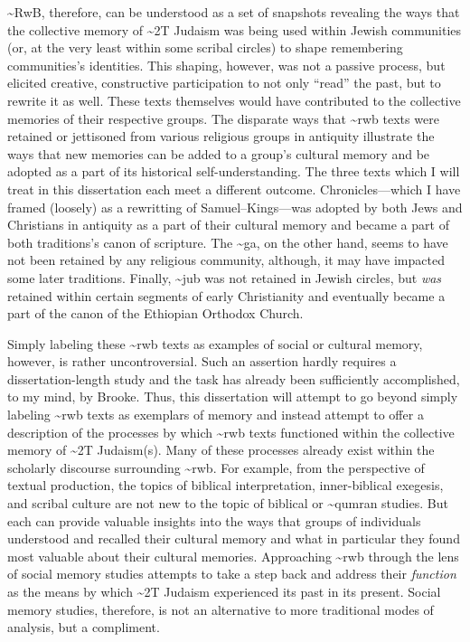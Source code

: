 \textasciitilde{}RwB, therefore, can be understood as a set of snapshots
revealing the ways that the collective memory of \textasciitilde{}2T
Judaism was being used within Jewish communities (or, at the very least
within some scribal circles) to shape remembering communities's
identities. This shaping, however, was not a passive process, but
elicited creative, constructive participation to not only ``read'' the
past, but to rewrite it as well. These texts themselves would have
contributed to the collective memories of their respective groups. The
disparate ways that \textasciitilde{}rwb texts were retained or
jettisoned from various religious groups in antiquity illustrate the
ways that new memories can be added to a group's cultural memory and be
adopted as a part of its historical self-understanding. The three texts
which I will treat in this dissertation each meet a different outcome.
Chronicles---which I have framed (loosely) as a rewritting of
Samuel--Kings---was adopted by both Jews and Christians in antiquity as
a part of their cultural memory and became a part of both traditions's
canon of scripture. The \textasciitilde{}ga, on the other hand, seems to
have not been retained by any religious community, although, it may have
impacted some later traditions. Finally, \textasciitilde{}jub was not
retained in Jewish circles, but \emph{was} retained within certain
segments of early Christianity and eventually became a part of the canon
of the Ethiopian Orthodox Church.

Simply labeling these \textasciitilde{}rwb texts as examples of social
or cultural memory, however, is rather uncontroversial. Such an
assertion hardly requires a dissertation-length study and the task has
already been sufficiently accomplished, to my mind, by
Brooke.\autocite{brooke_zsengeller2014} Thus, this dissertation will
attempt to go beyond simply labeling \textasciitilde{}rwb texts as
exemplars of memory and instead attempt to offer a description of the
processes by which \textasciitilde{}rwb texts functioned within the
collective memory of \textasciitilde{}2T Judaism(s). Many of these
processes already exist within the scholarly discourse surrounding
\textasciitilde{}rwb. For example, from the perspective of textual
production, the topics of biblical interpretation, inner-biblical
exegesis, and scribal culture are not new to the topic of biblical or
\textasciitilde{}qumran studies. But each can provide valuable insights
into the ways that groups of individuals understood and recalled their
cultural memory and what in particular they found most valuable about
their cultural memories. Approaching \textasciitilde{}rwb through the
lens of social memory studies attempts to take a step back and address
their \emph{function} as the means by which \textasciitilde{}2T Judaism
experienced its past in its present. Social memory studies, therefore,
is not an alternative to more traditional modes of analysis, but a
compliment.
